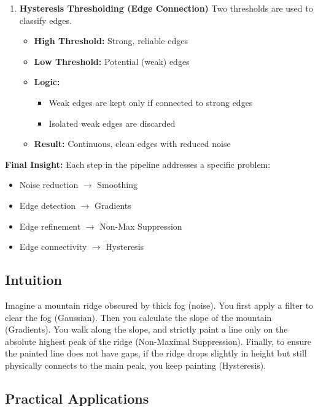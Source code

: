 \documentclass[12pt]{article}
\begin{document}
\begin{enumerate}
    \item \textbf{Hysteresis Thresholding (Edge Connection)}
          Two thresholds are used to classify edges.
          \begin{itemize}
              \item \textbf{High Threshold:} Strong, reliable edges
              \item \textbf{Low Threshold:} Potential (weak) edges
              \item \textbf{Logic:}
                    \begin{itemize}
                        \item Weak edges are kept only if connected to strong edges
                        \item Isolated weak edges are discarded
                    \end{itemize}
              \item \textbf{Result:} Continuous, clean edges with reduced noise
          \end{itemize}
\end{enumerate}

\textbf{Final Insight:}
Each step in the pipeline addresses a specific problem:
\begin{itemize}
    \item Noise reduction $\rightarrow$ Smoothing
    \item Edge detection $\rightarrow$ Gradients
    \item Edge refinement $\rightarrow$ Non-Max Suppression
    \item Edge connectivity $\rightarrow$ Hysteresis
\end{itemize}

\subsection{Intuition}

Imagine a mountain ridge obscured by thick fog (noise). You first apply a filter to clear the fog (Gaussian). Then you calculate the slope of the mountain (Gradients). You walk along the slope, and strictly paint a line only on the absolute highest peak of the ridge (Non-Maximal Suppression). Finally, to ensure the painted line does not have gaps, if the ridge drops slightly in height but still physically connects to the main peak, you keep painting (Hysteresis).

\subsection{Practical Applications}
\end{document}
